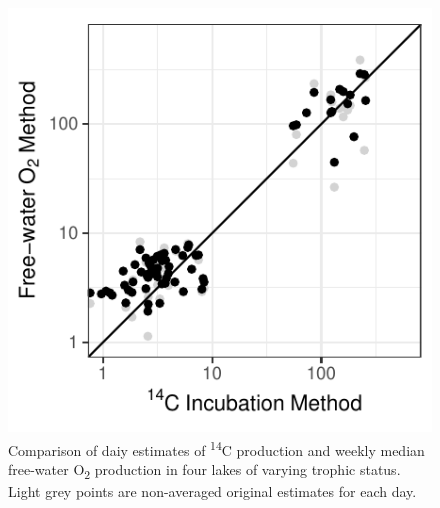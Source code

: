 \documentclass[12pt, oneside]{article}
\begin{document}
\newpage
\begin{figure}
\centering
\includegraphics{median_point.pdf}
\caption{Comparison of daiy estimates of \textsuperscript{14}C production and weekly median free-water O\textsubscript{2} production in four lakes of varying trophic status. Light grey points are non-averaged original estimates for each day.}
\label{fig:medianvalues}
\end{figure}
\clearpage

\appendix
\end{document}
